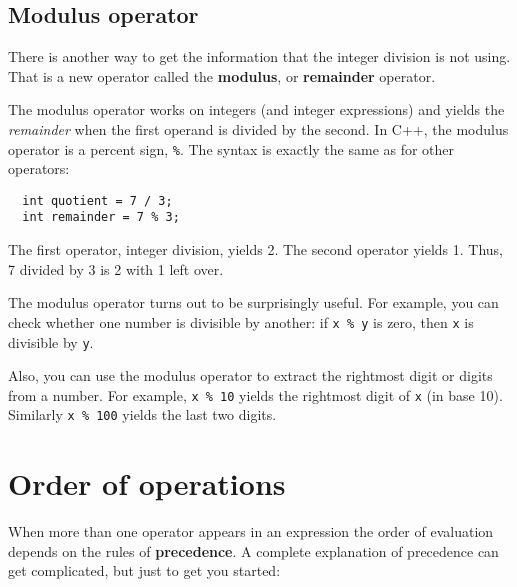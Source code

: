 \subsection{Modulus operator}
\label{modulus}
There is another way to get the information that the integer division is not using. That is a new operator called the {\bf modulus}, or {\bf remainder} operator.

The modulus operator works on integers (and integer expressions)
and yields the {\em remainder} when the first operand is divided
by the second.  In C++, the modulus operator is a percent sign,
{\tt \%}.  The syntax is exactly the same as for other operators:

\begin{lstlisting}
  int quotient = 7 / 3;
  int remainder = 7 % 3;
\end{lstlisting}
%
The first operator, integer division, yields 2.  The second
operator yields 1.  Thus, 7 divided by 3 is 2 with 1 left over.

The modulus operator turns out to be surprisingly useful.  For
example, you can check whether one number is divisible by
another: if {\tt x \% y} is zero, then {\tt x} is divisible
by {\tt y}.

Also, you can use the modulus operator to extract the rightmost
digit or digits from a number.  For example, {\tt x \% 10} yields
the rightmost digit of {\tt x} (in base 10).  Similarly
{\tt x \% 100} yields the last two digits.

\section{Order of operations}

When more than one operator appears in an expression the order
of evaluation depends on the rules of {\bf precedence}.  A
complete explanation of precedence can get complicated, but
just to get you started:

